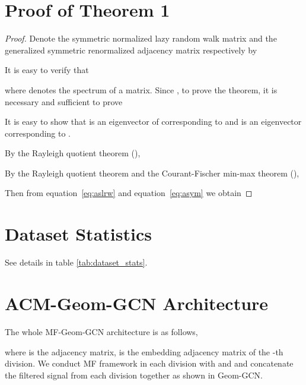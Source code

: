 \documentclass{article}
\newcommand{\0}{{\boldsymbol{0}}}
\newcommand{\6}{{\partial}}
\newcommand{\8}{{\infty}}
\newcommand{\4}{{\nabla}}
\def\eqref#1{equation~\ref{#1}}
\begin{document}
\iffalse
\section{Proof of Theorem 1}
\label{apprndix:proof_eigengap}
\begin{proof}
Denote the symmetric normalized lazy random walk matrix
and the generalized symmetric renormalized adjacency matrix respectively by


It is easy to verify that 

where  denotes the spectrum of a matrix.
Since , 
to prove the theorem, it is necessary and sufficient to prove

It is easy to show that  is an eigenvector of 
corresponding to 
and  is an eigenvector 
corresponding to . 


By the Rayleigh quotient theorem (\citealp[Sec. 4.3]{HorJ13}),

By the Rayleigh quotient theorem and the Courant-Fischer min-max theorem (\citealp[Sec. 4.3]{HorJ13}), 

Then from \eqref{eq:aslrw} and \eqref{eq:asym} we obtain

\iffalse

where ,  is nonsingular and . Then

To prove , for any  , consider the following difference

Since the denominator is always positive for any  and , we only consider the numerator,

any  and 

Then the above formula is smaller or equal to

\fi
\end{proof}


\section{Dataset Statistics}
See details in table \ref{tab:dataset_stats}.
\label{appendix:dataset_stats}

\section{ACM-Geom-GCN Architecture}
\label{appendix:mfgeomgcn}
The whole MF-Geom-GCN architecture is as follows,

where  is the adjacency matrix,  is the embedding adjacency matrix of the -th division.
We conduct MF framework in each division with  and  and concatenate the filtered signal from each division together as shown in Geom-GCN.
\end{document}
